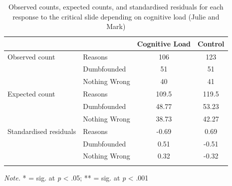 \documentclass[
  american,
  man,floatsintext]{apa7}
\begin{document}
\begin{table}[tbp]

\begin{center}
\begin{threeparttable}

\caption{\label{tab:tabS6tab1dumbIncest}Observed counts, expected counts, and standardised residuals for each response to the critical slide depending on cognitive load (Julie and Mark)}

\begin{tabular}{llcc}
\toprule
 & \multicolumn{1}{c}{} & \multicolumn{1}{c}{Cognitive Load} & \multicolumn{1}{c}{Control}\\
\midrule
Observed count & Reasons & 106 & 123\\
 & Dumbfounded & 51 & 51\\
 & Nothing Wrong & 40 & 41\\
Expected count & Reasons & 109.5 & 119.5\\
 & Dumbfounded & 48.77 & 53.23\\
 & Nothing Wrong & 38.73 & 42.27\\
Standardised residuals & Reasons & -0.69 & 0.69\\
 & Dumbfounded & 0.51 & -0.51\\
 & Nothing Wrong & 0.32 & -0.32\\
\bottomrule
\addlinespace
\end{tabular}

\begin{tablenotes}[para]
\normalsize{\textit{Note.} * = sig. at \emph{p} < .05; ** = sig. at \emph{p} < .001}
\end{tablenotes}

\end{threeparttable}
\end{center}

\end{table}
\end{document}
